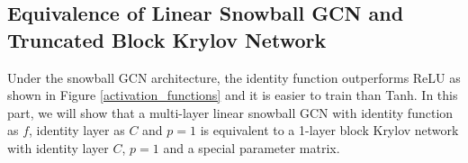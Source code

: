 \documentclass{article}
\begin{document}
\subsection{Equivalence of Linear Snowball GCN and Truncated Block Krylov Network}
\label{linear_snowball}

Under the snowball GCN architecture, the identity function outperforms ReLU as shown in Figure \ref{activation_functions} and it is easier to train than Tanh. In this part, we will show that a multi-layer linear snowball GCN with identity function as $f$, identity layer as $C$ and $p=1$ is equivalent to a 1-layer block Krylov network with identity layer $C$, $p =1$ and a special parameter matrix.
\end{document}
